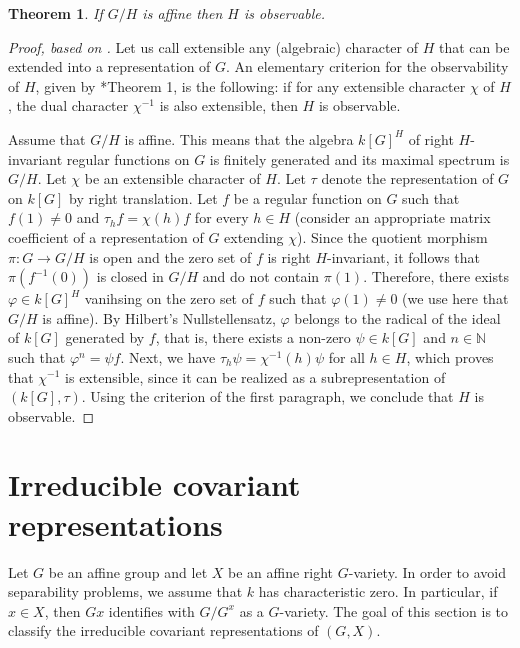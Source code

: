 \documentclass{amsart}
\newtheorem{theorem}{Theorem}
\theoremstyle{definition}
\begin{document}
\begin{theorem}\label{surjectivitye1}
    If $G/H$ is affine then $H$ is observable.
\end{theorem}

\begin{proof}[Proof, based on \cite{BBHM}]
    Let us call extensible any (algebraic) character of $H$ that can be extended into a representation of $G$. An elementary criterion for the observability of $H$, given by \cite{BBHM}*{Theorem 1}, is the following: if for any extensible character $\chi$ of $H$, the dual character $\chi^{-1}$ is also extensible, then $H$ is observable.
    
    Assume that $G/H$ is affine. This means that the algebra $k[G]^H$ of right $H$-invariant regular functions on $G$ is finitely generated and its maximal spectrum is $G/H$. Let $\chi$ be an extensible character of $H$. Let $\tau$ denote the representation of $G$ on $k[G]$ by right translation. Let $f$ be a regular function on $G$ such that $f(1) \neq 0$ and $\tau_h f = \chi(h) f$ for every $h \in H$ (consider an appropriate matrix coefficient of a representation of $G$ extending $\chi$). Since the quotient morphism $\pi : G \to G/H$ is open and the zero set of $f$ is right $H$-invariant, it follows that $\pi(f^{-1}(0))$ is closed in $G/H$ and do not contain $\pi(1)$. Therefore, there exists $\varphi \in k[G]^H$ vanihsing on the zero set of $f$ such that $\varphi(1) \neq 0$ (we use here that $G/H$ is affine). By Hilbert's Nullstellensatz, $\varphi$ belongs to the radical of the ideal of $k[G]$ generated by $f$, that is, there exists a non-zero $\psi \in k[G]$ and $n \in \mathbb{N}$ such that $\varphi^n = \psi f$. Next, we have $\tau_h \psi = \chi^{-1}(h)\psi$ for all $h \in H$, which proves that $\chi^{-1}$ is extensible, since it can be realized as a subrepresentation of $(k[G], \tau)$. Using the criterion of the first paragraph, we conclude that $H$ is observable.
\end{proof}

\section{Irreducible covariant representations}

Let $G$ be an affine group and let $X$ be an affine right $G$-variety. In order to avoid separability problems, we assume that $k$ has characteristic zero. In particular, if $x \in X$, then $Gx$ identifies with $G/G^x$ as a $G$-variety. The goal of this section is to classify the irreducible covariant representations of $(G,X)$. 
\end{document}
